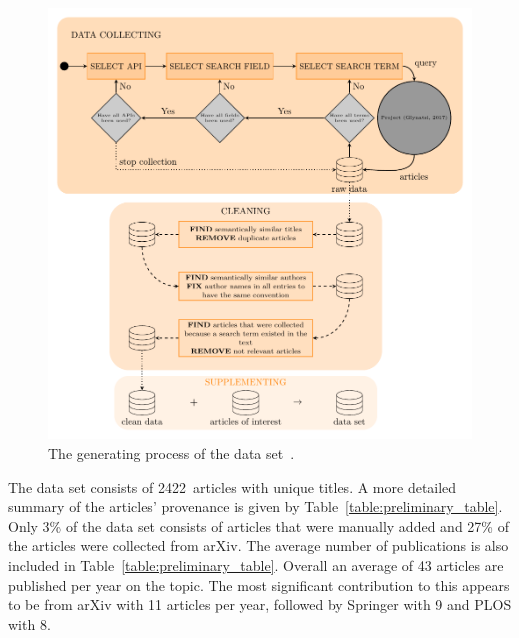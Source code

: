 \documentclass{article}
\theoremstyle{definition}
\newcommand{\totalarticles}{2422}
\begin{document}
\begin{figure}[!hbtp]
    \begin{center}
        \includegraphics[width=.8\textwidth]{data_collection_diagram.pdf}
    \end{center}
    \caption{The generating process of the data set~\citep{pd_data_2018}.}\label{figure:colection_process}
\end{figure}


The data set consists of \totalarticles~articles with unique
titles. A more detailed summary of the articles' provenance
is given by Table~\ref{table:preliminary_table}. Only 3\% of the data set consists of
articles that were manually added and 27\% of the articles were collected from
arXiv. The average number of publications is also included in
Table~\ref{table:preliminary_table}. Overall an average of 43 articles are published
per year on the topic. The most significant contribution to this appears to be
from arXiv with 11 articles per year, followed by Springer with 9 and PLOS with
8.
\end{document}
